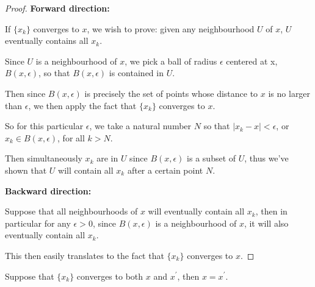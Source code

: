 \begin{proof}

\textbf{Forward direction:} 

If $\{x_k\}$ converges to $x$, we wish to prove: given any neighbourhood $U$ of $x$, $U$ eventually contains all $x_k$.

Since $U$ is a neighbourhood of $x$, we pick a ball of radius $\epsilon$ centered at x, $B(x,\epsilon)$, so that $B(x,\epsilon)$ is contained in $U$.

Then since $B(x,\epsilon)$ is precisely the set of points whose distance to $x$ is no larger than $\epsilon$, we then apply the fact that $\{x_k\}$ converges to $x$.

So for this particular $\epsilon$, we take a natural number $N$ so that $|x_k-x|<\epsilon$, or $x_k \in B(x,\epsilon)$, for all $k>N$.

Then simultaneously $x_k$ are in $U$ since $B(x,\epsilon)$ is a subset of $U$, thus we've shown that $U$ will contain all $x_k$ after a certain point $N$.

\vspace{.5cm}

\textbf{Backward direction:}

Suppose that all neighbourhoods of $x$ will eventually contain all $x_k$, then in particular for any $\epsilon>0$, since $B(x,\epsilon)$ is a neighbourhood of $x$, it will also eventually contain all $x_k$.

This then easily translates to the fact that $\{x_k\}$ converges to $x$.
\end{proof}

\begin{proposition}
Suppose that $\{x_k\}$ converges to both $x$ and $x^\prime$, then $x=x^\prime$.
\end{proposition}

